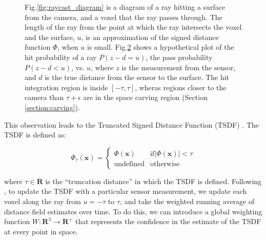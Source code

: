 \documentclass[10pt,twocolumn,letterpaper]{article}
\newcommand{\figref}[1]{Fig.\ref{#1}}
\begin{document}
\begin{figure}
\begin{subfigure}{1.0\columnwidth}
         \caption{}
  \label{fig:integration_diagram}
   \end{subfigure}
   \caption{\figref{fig:raycast_diagram} is a diagram of a ray hitting a
   surface from the camera, and a voxel that the ray passes through. The length of the ray from the point at
      which the ray intersects the voxel and the surface, $u$, is an
      approximation of the signed distance function $\Phi$, when $u$ is small.
      \figref{fig:integration_diagram} shows a hypothetical plot of the
      hit probability of a ray $P\left(z - d = u \right) $, the pass
      probability $P\left(z - d < u\right)$, vs. $u$, where $z$ is the
      measurement from the sensor, and $d$ is the true distance from the sensor
      to the surface. The hit integration region is inside $[-\tau, \tau]$,
      wheras regions closer to the camera than  $\tau + \epsilon$ are in the space carving region (Section \ref{section:carving}). }
\end{figure} 

This observation leads to the Truncated Signed Distance Function (TSDF)
\cite{Curless1996}. The TSDF is defined as:

\begin{equation}
	\Phi_{\tau}(\mathbf{x}) = 
	\begin{cases}
		\Phi(\mathbf{x}) &  \text{if} |\Phi(\mathbf{x})| < \tau \\
		\text{undefined} & \text{otherwise}
	\end{cases}
\end{equation}

\noindent where $\tau \in \mathbf{R}$ is the ``truncation distance'' in which
the TSDF is defined. Following \cite{Curless1996}, to update the TSDF with a
particular sensor measurement, we update each voxel along the ray from $u =
-\tau$ to $\tau$, and take the weighted running average of distance field estimates over time. To do
this, we can introduce a global weighting function $W : \mathbf{R}^3 \to
\mathbf{R^{+}}$ that represents the confidence in the estimate of the TSDF at
every point in space.
\end{document}
